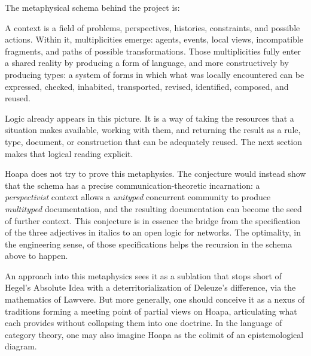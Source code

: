 \documentclass[11pt]{article}
\begin{document}
The metaphysical schema behind the project is:

\begin{center}
\end{center}

A context is a field of problems, perspectives, histories, constraints, and
possible actions. Within it, multiplicities emerge: agents, events, local
views, incompatible fragments, and paths of possible transformations. Those
multiplicities fully enter a shared reality by producing a form of language,
and more constructively by producing types: a system of forms in which what was
locally encountered can be expressed, checked, inhabited, transported, revised,
identified, composed, and reused.

Logic already appears in this picture. It is a way of taking the resources
that a situation makes available, working with them, and returning the result
as a rule, type, document, or construction that can be adequately reused. The
next section makes that logical reading explicit.

Hoapa does not try to prove this metaphysics. The conjecture would instead
show that the schema has a precise communication-theoretic incarnation: a
\emph{perspectivist} context allows a \emph{unityped} concurrent community to
produce \emph{multityped} documentation, and the resulting documentation can
become the seed of further context. This conjecture is in essence the bridge
from the specification of the three adjectives in italics to an open logic for
networks. The optimality, in the engineering sense, of those specifications
helps the recursion in the schema above to happen.

An approach into this metaphysics sees it as a sublation that stops short of
Hegel's Absolute Idea with a deterritorialization of Deleuze's difference, via
the mathematics of Lawvere. But more generally, one should conceive it as a
nexus of traditions forming a meeting point of partial views on Hoapa,
articulating what each provides without collapsing them into one doctrine. In
the language of category theory, one may also imagine Hoapa as the colimit of
an epistemological diagram.
\end{document}

